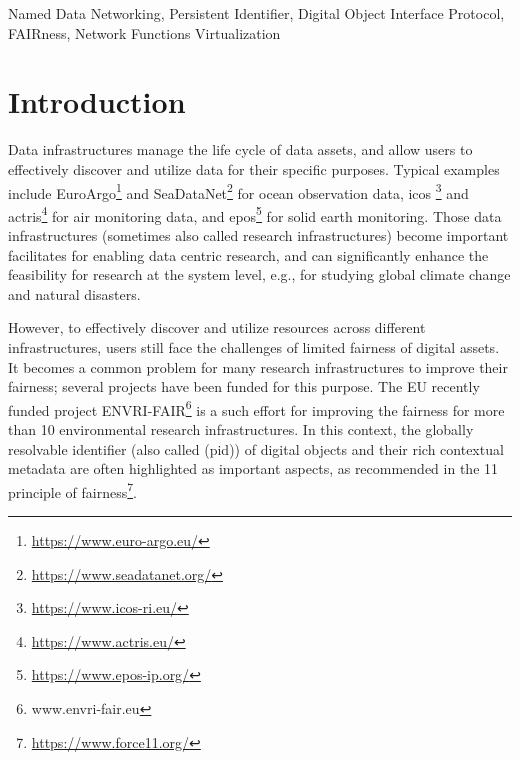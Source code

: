 \documentclass[conference]{IEEEtran}
\begin{document}
\begin{abstract}
\end{abstract}

\begin{IEEEkeywords}
Named Data Networking, Persistent Identifier, Digital Object Interface Protocol, FAIRness, Network Functions Virtualization
\end{IEEEkeywords}

\section{Introduction}
Data infrastructures manage the life cycle of data assets, and allow users to effectively discover and utilize data for their specific purposes. Typical examples include EuroArgo\footnote{\url{https://www.euro-argo.eu/}} and SeaDataNet\footnote{\url{https://www.seadatanet.org/}} for ocean observation data, \gls{icos} \footnote{\url{https://www.icos-ri.eu/}} and \gls{actris}\footnote{\url{https://www.actris.eu/}} for air monitoring data, and \gls{epos}\footnote{\url{https://www.epos-ip.org/}} for solid earth monitoring. Those data infrastructures (sometimes also called research infrastructures) become important facilitates for enabling data centric research, and can significantly enhance the feasibility for research at the system level, e.g., for studying global climate change and natural disasters.

However, to effectively discover and utilize resources across different infrastructures, users still face the challenges of limited \gls{fairness} of digital assets. It becomes a common problem for many research infrastructures to improve their \gls{fairness}; several projects have been funded for this purpose. The EU recently funded project ENVRI-FAIR\footnote{www.envri-fair.eu} is a such effort for improving the \gls{fairness} for more than 10 environmental research infrastructures. In this context, the globally resolvable identifier (also called (\gls{pid})) of digital objects and their rich contextual metadata are often highlighted as important aspects, as recommended in the 11 principle of \gls{fairness}\footnote{\url{https://www.force11.org/}}.
\end{document}
